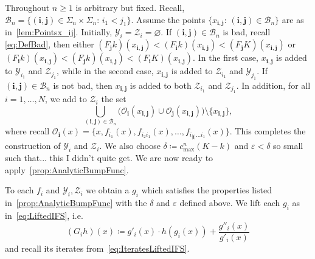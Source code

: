 \documentclass[12pt,]{article}
\def\cref#1{\ref{#1}}%
\theoremstyle{definition}
\theoremstyle{remark}
\newcommand{\0}{\mathbf{0}}
\newcommand{\bi}{\mathbf{i}}
\newcommand{\bj}{\mathbf{j}}
\begin{document}
{Throughout $n\geq 1$ is arbitrary but fixed. Recall,
$\mathcal{B}_n=\{(\bi,\bj)\in\Sigma_n\times\Sigma_n:\, i_1<j_1\}$. Assume the points
$\{x_{\bi,\bj}:\, (\bi,\bj)\in\mathcal{B}_n\}$ are as in~\cref{lem:Pointsx_ij}. Initially,
$\mathcal{Y}_i=\mathcal{Z}_i=\varnothing$. If $(\bi,\bj)\in\mathcal{B}_n$ is bad, recall
\cref{eq:DefBad}, then either $(F_{\bj}k)(x_{\bi,\bj})<
(F_{\bi}k)(x_{\bi,\bj})<(F_{\bj}K)(x_{\bi,\bj})$ or $(F_{\bi}k)(x_{\bi,\bj})<
(F_{\bj}k)(x_{\bi,\bj})<(F_{\bi}K)(x_{\bi,\bj})$. In the first case, $x_{\bi,\bj}$ is added to
$\mathcal{Y}_{i_1}$ and $\mathcal{Z}_{j_1}$, while in the second case, $x_{\bi,\bj}$ is added to
$\mathcal{Z}_{i_1}$ and $\mathcal{Y}_{j_1}$. If $(\bi,\bj)\in\mathcal{B}_n$ is not bad, then
$x_{\bi,\bj}$ is added to both $\mathcal{Z}_{i_1}$ and $\mathcal{Z}_{j_1}$. In addition, for all
$i=1,\ldots,N$, we add to $\mathcal{Z}_i$ the set
\begin{equation*}
\bigcup_{(\bi,\bj)\in\mathcal{B}_n} \big(\mathcal{O}_{\bi}(x_{\bi,\bj})\cup
\mathcal{O}_{\bj}(x_{\bi,\bj})\big)\setminus\{x_{\bi,\bj}\},
\end{equation*}
where recall $\mathcal{O}_{\bi}(x)= \{x,f_{i_1}(x), f_{i_2i_1}(x),\ldots,f_{i_{|\bi|}\ldots
i_1}(x)\}$. This completes the construction of $\mathcal{Y}_i$ and $\mathcal{Z}_i$. We also choose
$\delta\coloneqq c_{\max}^n(K-k)$ and $\varepsilon<\delta$ so small such that... {\color{red}this I
didn't quite get.} We are now ready to apply~\cref{prop:AnalyticBumpFunc}.

To each $f_i$ and $\mathcal{Y}_i, \mathcal{Z}_i$ we obtain a $g_i$ which satisfies the properties
listed in~\cref{prop:AnalyticBumpFunc} with the $\delta$ and $\varepsilon$ defined above. We lift
each $g_i$ as in~\cref{eq:LiftedIFS}, i.e. 
\begin{equation*}
(G_ih)(x)\coloneqq g'_i(x)\cdot h(g_i(x)) + \frac{g''_i(x)}{g'_i(x)}
\end{equation*}
and recall its iterates from~\eqref{eq:IteratesLiftedIFS}.

}
\end{document}
